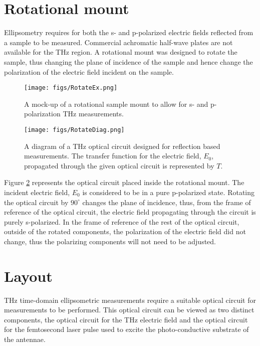 \section{Rotational mount}
\label{sec: rot}

Ellipsometry requires for both the s- and p-polarized electric fields reflected from a sample to be measured. Commercial achromatic half-wave plates are not available for the THz region. A rotational mount was designed to rotate the sample, thus changing the plane of incidence of the sample and hence change the polarization of the electric field incident on the sample.

\begin{figure}[H]
\begin{center}
	 \texttt{[image: figs/RotateEx.png]}
	 \caption{A mock-up of a rotational sample mount to allow for s- and p-polarization THz measurements.}
   \label{fig:RotEx}
\end{center}
\end{figure}

\begin{figure}[H]
\begin{center}
	 \texttt{[image: figs/RotateDiag.png]}
	 \caption{A diagram of a THz optical circuit designed for reflection based measurements. The transfer function for the electric field, $E_{0}$, propagated through the given optical circuit is represented by $T$.}
   \label{fig:RotDiag}
\end{center}
\end{figure}

Figure \ref{fig:RotDiag} represents the optical circuit placed inside the rotational mount. The incident electric field, $E_{0}$ is considered to be in a pure p-polarized state. Rotating the optical circuit by $90^{\circ}$ changes the plane of incidence, thus, from the frame of reference of the optical circuit, the electric field propagating through the circuit is purely s-polarized. In the frame of reference of the rest of the optical circuit, outside of the rotated components, the polarization of the electric field did not change, thus the polarizing components will not need to be adjusted. 

\section{Layout}
\label{sec: Lay}

THz time-domain ellipsometric measurements require a suitable optical circuit for measurements to be performed. This optical circuit can be viewed as two distinct components, the optical circuit for the THz electric field and the optical circuit for the femtosecond laser pulse used to excite the photo-conductive substrate of the antennae.

